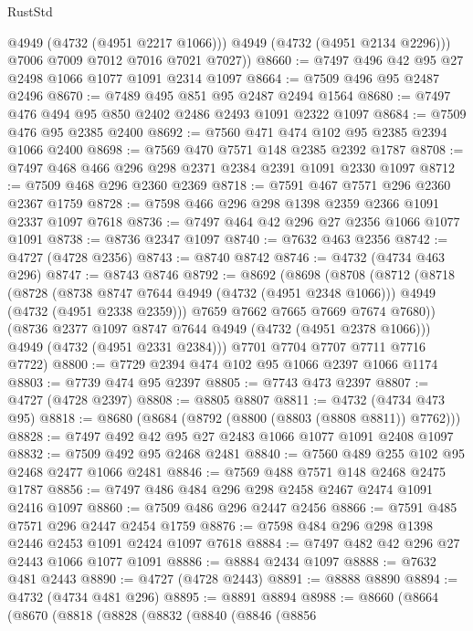 \begin{lexlean}{RustStd}
\begin{coremodule}
            @4949
            (@4732 (@4951 @2217 @1066)))
          @4949
          (@4732 (@4951 @2134 @2296)))
        @7006
        @7009
        @7012
        @7016
        @7021
        @7027))
@8660 := @7497 @496 @42 @95 @27 @2498 @1066 @1077 @1091 @2314 @1097
@8664 := @7509 @496 @95 @2487 @2496
@8670 := @7489 @495 @851 @95 @2487 @2494 @1564
@8680 := @7497 @476 @494 @95 @850 @2402 @2486 @2493 @1091 @2322 @1097
@8684 := @7509 @476 @95 @2385 @2400
@8692 := @7560 @471 @474 @102 @95 @2385 @2394 @1066 @2400
@8698 := @7569 @470 @7571 @148 @2385 @2392 @1787
@8708 := @7497 @468 @466 @296 @298 @2371 @2384 @2391 @1091 @2330 @1097
@8712 := @7509 @468 @296 @2360 @2369
@8718 := @7591 @467 @7571 @296 @2360 @2367 @1759
@8728 := @7598 @466 @296 @298 @1398 @2359 @2366 @1091 @2337 @1097 @7618
@8736 := @7497 @464 @42 @296 @27 @2356 @1066 @1077 @1091
@8738 := @8736 @2347 @1097
@8740 := @7632 @463 @2356
@8742 := @4727 (@4728 @2356)
@8743 := @8740 @8742
@8746 := @4732 (@4734 @463 @296)
@8747 := @8743 @8746
@8792 := @8692
    (@8698
      (@8708
        (@8712
          (@8718
            (@8728
              (@8738 @8747 @7644 @4949 (@4732 (@4951 @2348 @1066)))
              @4949
              (@4732 (@4951 @2338 @2359)))
            @7659
            @7662
            @7665
            @7669
            @7674
            @7680))
        (@8736 @2377 @1097 @8747 @7644 @4949 (@4732 (@4951 @2378 @1066)))
        @4949
        (@4732 (@4951 @2331 @2384)))
      @7701
      @7704
      @7707
      @7711
      @7716
      @7722)
@8800 := @7729 @2394 @474 @102 @95 @1066 @2397 @1066 @1174
@8803 := @7739 @474 @95 @2397
@8805 := @7743 @473 @2397
@8807 := @4727 (@4728 @2397)
@8808 := @8805 @8807
@8811 := @4732 (@4734 @473 @95)
@8818 := @8680 (@8684 (@8792 (@8800 (@8803 (@8808 @8811)) @7762)))
@8828 := @7497 @492 @42 @95 @27 @2483 @1066 @1077 @1091 @2408 @1097
@8832 := @7509 @492 @95 @2468 @2481
@8840 := @7560 @489 @255 @102 @95 @2468 @2477 @1066 @2481
@8846 := @7569 @488 @7571 @148 @2468 @2475 @1787
@8856 := @7497 @486 @484 @296 @298 @2458 @2467 @2474 @1091 @2416 @1097
@8860 := @7509 @486 @296 @2447 @2456
@8866 := @7591 @485 @7571 @296 @2447 @2454 @1759
@8876 := @7598 @484 @296 @298 @1398 @2446 @2453 @1091 @2424 @1097 @7618
@8884 := @7497 @482 @42 @296 @27 @2443 @1066 @1077 @1091
@8886 := @8884 @2434 @1097
@8888 := @7632 @481 @2443
@8890 := @4727 (@4728 @2443)
@8891 := @8888 @8890
@8894 := @4732 (@4734 @481 @296)
@8895 := @8891 @8894
@8988 := @8660
    (@8664
      (@8670
        (@8818
          (@8828
            (@8832
              (@8840
                (@8846
                  (@8856

\end{coremodule}
\end{lexlean}
